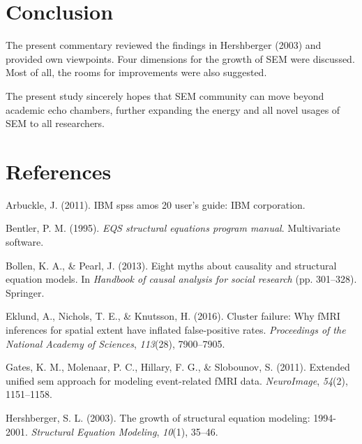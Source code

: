\documentclass[jou]{apa6}
\theoremstyle{definition}
\theoremstyle{definition}
\theoremstyle{definition}
\theoremstyle{remark}
\begin{document}
\hypertarget{conclusion}{%
\section{Conclusion}\label{conclusion}}

\noindent The present commentary reviewed the findings in Hershberger
(2003) and provided own viewpoints. Four dimensions for the growth of
SEM were discussed. Most of all, the rooms for improvements were also
suggested.

The present study sincerely hopes that SEM community can move beyond
academic echo chambers, further expanding the energy and all novel
usages of SEM to all researchers.

\newpage

\hypertarget{references}{%
\section{References}\label{references}}

\setlength{\parindent}{-0.5in}
\setlength{\leftskip}{0.5in}

\hypertarget{refs}{}
\leavevmode\hypertarget{ref-arbuckle2011ibm}{}%
Arbuckle, J. (2011). IBM spss amos 20 user's guide: IBM corporation.

\leavevmode\hypertarget{ref-bentler1995eqs}{}%
Bentler, P. M. (1995). \emph{EQS structural equations program manual}.
Multivariate software.

\leavevmode\hypertarget{ref-bollen2013eight}{}%
Bollen, K. A., \& Pearl, J. (2013). Eight myths about causality and
structural equation models. In \emph{Handbook of causal analysis for
social research} (pp. 301--328). Springer.

\leavevmode\hypertarget{ref-eklund2016cluster}{}%
Eklund, A., Nichols, T. E., \& Knutsson, H. (2016). Cluster failure: Why
fMRI inferences for spatial extent have inflated false-positive rates.
\emph{Proceedings of the National Academy of Sciences}, \emph{113}(28),
7900--7905.

\leavevmode\hypertarget{ref-gates2011extended}{}%
Gates, K. M., Molenaar, P. C., Hillary, F. G., \& Slobounov, S. (2011).
Extended unified sem approach for modeling event-related fMRI data.
\emph{NeuroImage}, \emph{54}(2), 1151--1158.

\leavevmode\hypertarget{ref-hershberger2003growth}{}%
Hershberger, S. L. (2003). The growth of structural equation modeling:
1994-2001. \emph{Structural Equation Modeling}, \emph{10}(1), 35--46.
\end{document}
